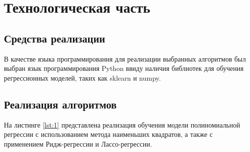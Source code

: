 \chapter{Технологическая часть}

\section{Средства реализации}

В качестве языка программирования для реализации выбранных алгоритмов был выбран язык программирования Python ввиду наличия библиотек для обучения регрессионных моделей, таких как sklearn и numpy.

\section{Реализация алгоритмов}

На листинге \ref{lst:1} представлена реализация обучения модели полиномиальной регрессии с использованием метода наименьших квадратов, а также с применением Ридж-регрессии и Лассо-регрессии.

